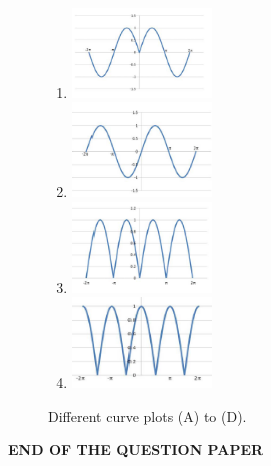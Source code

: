 \documentclass[journal]{IEEEtran}
\begin{document}
\begin{enumerate}[leftmargin=0pt]
\begin{figure}[h!]
    \centering
    \begin{enumerate}[label=(\Alph*), leftmargin=*]
        \item \includegraphics[width=0.35\textwidth]{figs/curveA.png}
        \item \includegraphics[width=0.35\textwidth]{figs/curveB.png}
        \item \includegraphics[width=0.35\textwidth]{figs/curveC.png}
        \item \includegraphics[width=0.35\textwidth]{figs/curveD.png}
    \end{enumerate}
    \caption{Different curve plots (A) to (D).}
    \label{fig:curves}
\end{figure}


\hfill{}
\end{enumerate}

\vspace{2em}
\begin{center}
    \textbf{\textsc{END OF THE QUESTION PAPER}}
\end{center}
\newpage
\end{document}
